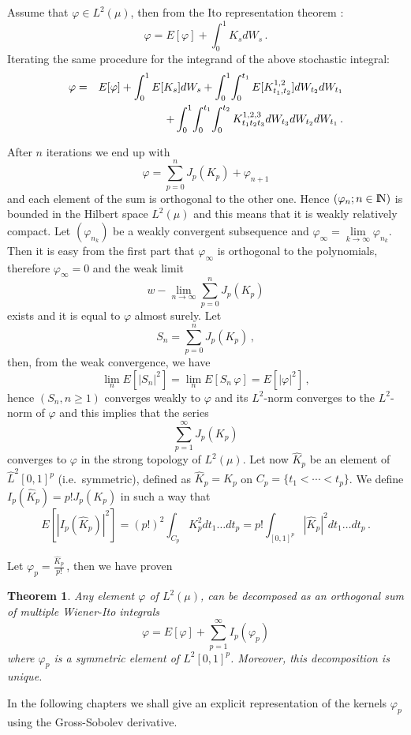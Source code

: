 \documentclass[12pt,a4paper]{book}
\newtheorem{theorem}{Theorem}[section]
\newcommand{\N}{{\rm I\!N}}
\newcommand{\remark}{\noindent {\bf Remark:\ }}
\begin{document}
Assume that  $\varphi\in L^2(\mu)$, then  from the Ito representation
theorem :
$$
\varphi =  E[\varphi]+\int_0^1K_sdW_s\,.
$$
Iterating the same procedure for the integrand of the above stochastic
integral:
\begin{eqnarray*}
\varphi & = & E[\varphi]+\int_0^1E[K_s]dW_s+\int_0^1\!\int_0^{t_1}
    E[K_{t_1,t_2}^{1,2}] dW_{t_2}dW_{t_1} \\
& &\hspace{0.8cm} +\int_0^1\!\int_0^{t_1}\!\int_0^{t_2}K_{t_1t_2t_3}^{1,2,3}
dW_{t_3}dW_{t_2}dW_{t_1}\,.
\end{eqnarray*}

\noindent
After $n$ iterations  we end up with
$$
\varphi=\sum_{p=0}^n J_p(K_p)+\varphi_{n+1}
$$
and each element of the sum is orthogonal to the other one. Hence $(\varphi_n;
n\in\N)$ is bounded in the Hilbert space  $L^2(\mu)$ and this means
that it is weakly relatively compact.  Let $(\varphi_{n_k})$ be a
weakly convergent
subsequence and $\varphi_\infty=\lim\limits_{k\to\infty}\varphi_{n_k}$. Then it
is easy from  the first part that $\varphi_\infty$ is orthogonal to the
polynomials, therefore $\varphi_\infty=0$ and the weak limit
$$
w-\lim_{n\to\infty}\sum_{p=0}^n J_p(K_p)
$$
exists and it is equal to $\varphi$ almost surely. Let 
$$
S_n=\sum_{p=0}^n J_p(K_p)\,,
$$
then, from the weak convergence, we have 
$$
\lim_nE[|S_n|^2]=\lim_n E[S_n\,\varphi]=E[|\varphi|^2]\,,
$$
hence $(S_n,n\geq 1)$ converges weakly to $\varphi$ and its $L^2$-norm
converges to the $L^2$-norm of $\varphi$ and this implies that  the series
$$
\sum_{p=1}^\infty J_p(K_p)
$$
converges to $\varphi$  in the strong topology of  $L^2(\mu)$. Let now
$\widehat{K}_p$ be an element of $\widehat{L}^2[0,1]^p$ (i.e.\ symmetric),
defined as $\widehat{K}_p=K_p$ on $C_p=\{t_1<\cdots<t_p\}$. We define
$I_p(\widehat{K}_p)=p!J_p(K_p)$ in such a way that 
$$
E[|I_p(\widehat{K}_p)|^2]=(p!)^2\int_{C_p}K^2_p dt_1\ldots dt_p=p!
\int_{[0,1]^p}|\widehat{K}_p|^2 dt_1\ldots dt_p\,.
$$

\noindent
Let $\varphi_p=\frac{\widehat{K}_p}{p!}\,$, then we have proven
\begin{theorem}
\label{chaos-thm}
Any element $\varphi$ of $L^2(\mu)$, can be decomposed as an orthogonal
sum of multiple Wiener-Ito integrals
$$
\varphi=E[\varphi]+\sum_{p=1}^\infty I_p(\varphi_p)
$$
where $\varphi_p$ is a symmetric element of $ L^2[0,1]^p$. Moreover,
this decomposition is unique.
\end{theorem}
\remark
In the following chapters we shall give an explicit representation of
the kernels $\varphi_p$ using the Gross-Sobolev derivative.
\end{document}
